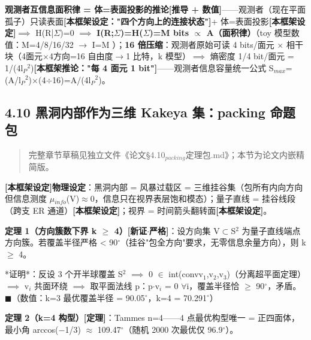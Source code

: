 \documentclass[12pt]{article}
\newcommand{\mtag}[1]{\textbf{[#1]}}
\newcommand{\up}[1]{\ensuremath{^{#1}}}
\newcommand{\down}[1]{\ensuremath{_{#1}}}
\begin{document}
\textbf{观测者互信息面积律 = 体=表面投影的推论}\mtag{推导 + 数值}------观测者（现在平面孤子）只读表面\mtag{本框架设定："四个方向上的连接状态"}+ 体=表面投影\mtag{本框架设定}\ensuremath{\implies} H(R|\ensuremath{\Sigma})=0 \ensuremath{\implies} \textbf{I(R;\ensuremath{\Sigma})=H(\ensuremath{\Sigma})=M bits \ensuremath{\propto} A（面积律）}（toy 模型数值：M=4/8/16/32 \ensuremath{\to} I=M \checkmark）；\textbf{16 倍压缩}：观测者原始可读 4 bits/面元 \ensuremath{\times} 相干块（4面元\ensuremath{\times}4方向=16 自由度\ensuremath{\to}1 比特，k 模型）\ensuremath{\implies} 熵密度 1/4 bit/面元 = 1/(4l\down{P}\up{2})\mtag{本框架推论："每 4 面元 1 bit"}------观测者信息容量统一公式 S\down{max}=(A/l\down{P}\up{2})\ensuremath{\times}(4\ensuremath{\div}16)=A/(4l\down{P}\up{2})。

\subsection{4.10 黑洞内部作为三维 Kakeya 集：packing 命题包}

\begin{quote}
完整章节草稿见独立文件《论文\S{}4.10\down{packing}定理包.md》；本节为论文内嵌精简版。
\end{quote}

\textbf{\mtag{本框架设定}物理设定}：黑洞内部 = 风暴过载区 = 三维挂谷集（包所有内向方向但信息测度 \ensuremath{\mu}\down{info}(V)\ensuremath{\approx}0，信息只在视界表层饱和模态）；量子直线 = 挂谷线段（跨支 ER 通道）\mtag{本框架设定}；视界 = 时间箭头翻转面\mtag{本框架设定}。

\textbf{定理 1（方向簇数下界 k \ensuremath{\geq} 4）\mtag{新证\ensuremath{\cdot}严格}}：设方向集 V\ensuremath{\subset}S\up{2} 为量子直线端点方向簇。若覆盖半径严格 < 90\ensuremath{^{\circ}}（挂谷"包全方向"要求，无零信息余量方向），则 k \ensuremath{\geq} 4。

*证明*：反设 3 个开半球覆盖 S\up{2} \ensuremath{\implies} 0 \ensuremath{\in} int(conv{v\down{1},v\down{2},v\down{3}})（分离超平面定理）\ensuremath{\implies} v\down{i} 共面环绕 \ensuremath{\implies} 取平面法线 p：p\ensuremath{\cdot}v\down{i} = 0 \ensuremath{\forall}i，覆盖半径恰 \ensuremath{\geq} 90\ensuremath{^{\circ}}，矛盾。\ensuremath{\blacksquare}（数值：k=3 最优覆盖半径 = 90.05\ensuremath{^{\circ}}，k=4 = 70.291\ensuremath{^{\circ}}）

\textbf{定理 2（k=4 构型）\mtag{定理}}：Tammes n=4------4 点最优构型唯一 = 正四面体，最小角 arccos(\ensuremath{-}1/3) \ensuremath{\approx} 109.47\ensuremath{^{\circ}}（随机 2000 次最优仅 96.9\ensuremath{^{\circ}}）。
\end{document}
